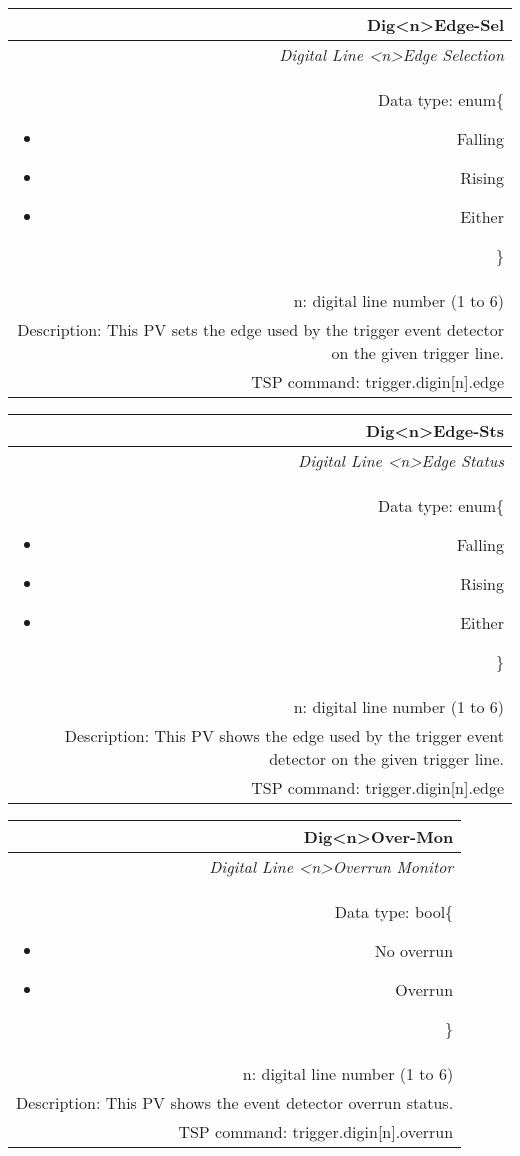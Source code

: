 \documentclass[openany]{article}
\begin{document}
		\begin{tabular}{N}
			\hline
			\bfseries Dig{\textless n\textgreater}Edge-Sel\label{pv:digedge-sel} \\ \hline
			\emph{Digital Line \textless n\textgreater Edge Selection} \\
			Data type: enum\{\begin{itemize}[noitemsep]
				\small
				\item[] Falling
				\item[] Rising
				\item[] Either
			\end{itemize}\} \\
			n: digital line number (1 to 6) \\
			Description: This PV sets the edge used by the trigger event detector on the given trigger line. \\
			TSP command: trigger.digin[n].edge
		\end{tabular}

		\begin{tabular}{N}
			\hline
			\bfseries Dig{\textless n\textgreater}Edge-Sts\label{pv:digedge-sts} \\ \hline
			\emph{Digital Line \textless n\textgreater Edge Status} \\
			Data type: enum\{\begin{itemize}[noitemsep]
				\small
				\item[] Falling
				\item[] Rising
				\item[] Either
			\end{itemize}\} \\
			n: digital line number (1 to 6) \\
			Description: This PV shows the edge used by the trigger event detector on the given trigger line. \\
			TSP command: trigger.digin[n].edge
		\end{tabular}

		\begin{tabular}{N}
			\hline
			\bfseries Dig{\textless n\textgreater}Over-Mon\label{pv:digover-mon} \\ \hline
			\emph{Digital Line \textless n\textgreater Overrun Monitor} \\
			Data type: bool\{\begin{itemize}[noitemsep]
				\small
				\item[] No overrun
				\item[] Overrun
			\end{itemize}\} \\
			n: digital line number (1 to 6) \\
			Description: This PV shows the event detector overrun status. \\
			TSP command: trigger.digin[n].overrun
		\end{tabular}
\end{document}
